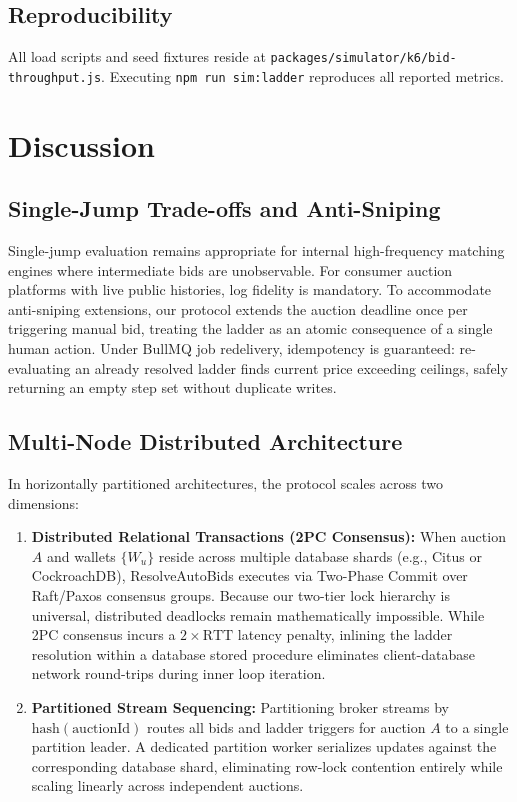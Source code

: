 \documentclass[conference]{IEEEtran}
\begin{document}
\subsection{Reproducibility}
All load scripts and seed fixtures reside at {\small\tt packages/simulator/k6/\allowbreak bid-throughput.js}.
Executing {\tt npm run sim:ladder} reproduces all reported metrics.

\section{Discussion}

\subsection{Single-Jump Trade-offs and Anti-Sniping}
Single-jump evaluation remains appropriate for internal high-frequency matching engines
where intermediate bids are unobservable. For consumer auction platforms with live public
histories, log fidelity is mandatory. To accommodate anti-sniping extensions, our protocol
extends the auction deadline once per triggering manual bid, treating the ladder as an
atomic consequence of a single human action. Under BullMQ job redelivery, idempotency is
guaranteed: re-evaluating an already resolved ladder finds current price exceeding ceilings,
safely returning an empty step set without duplicate writes.

\subsection{Multi-Node Distributed Architecture}
\label{subsec:multinode}
In horizontally partitioned architectures, the protocol scales across two dimensions:
\begin{enumerate}
  \item \textbf{Distributed Relational Transactions (2PC Consensus):} When auction $A$ and
    wallets $\{W_u\}$ reside across multiple database shards (e.g., Citus or CockroachDB),
    ResolveAutoBids executes via Two-Phase Commit over Raft/Paxos consensus groups. Because our
    two-tier lock hierarchy is universal, distributed deadlocks remain mathematically impossible.
    While 2PC consensus incurs a $2\times\text{RTT}$ latency penalty, inlining the ladder
    resolution within a database stored procedure eliminates client-database network round-trips
    during inner loop iteration.
  \item \textbf{Partitioned Stream Sequencing:} Partitioning broker streams by
    $\text{hash}(\text{auctionId})$ routes all bids and ladder triggers for auction $A$ to a
    single partition leader. A dedicated partition worker serializes updates against the
    corresponding database shard, eliminating row-lock contention entirely while scaling
    linearly across independent auctions.
\end{enumerate}
\end{document}

